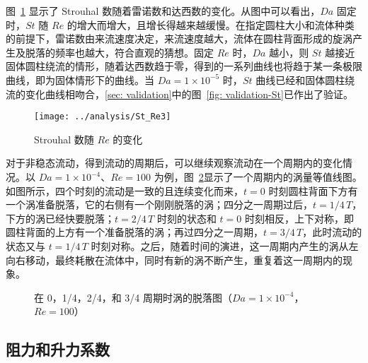 图~\ref{fig: St} 显示了 Strouhal 数随着雷诺数和达西数的变化。从图中可以看出，$Da$ 固定时，$St$ 随 $Re$ 的增大而增大，且增长得越来越缓慢。在指定圆柱大小和流体种类的前提下，雷诺数由来流速度决定，来流速度越大，流体在圆柱背面形成的旋涡产生及脱落的频率也越大，符合直观的猜想。固定 $Re$ 时，$Da$ 越小，则 $St$ 越接近固体圆柱绕流的情形，随着达西数趋于零，得到的一系列曲线也将趋于某一条极限曲线，即为固体情形下的曲线。当 $Da=1 \times 10^{-5}$ 时，$St$ 曲线已经和固体圆柱绕流的变化曲线相吻合，\ref{sec: validation}中的图~\ref{fig: validation-St}已作出了验证。

\begin{figure}
	\centering
	\texttt{[image: ../analysis/St\_Re3]}
	\caption{Strouhal 数随 $Re$ 的变化}
	\label{fig: St}
\end{figure}

对于非稳态流动，得到流动的周期后，可以继续观察流动在一个周期内的变化情况。以 $Da=1\times 10^{-4}$、$Re=100$ 为例，图~\ref{fig: 4*vortex}显示了一个周期内的涡量等值线图。如图所示，四个时刻的流动是一致的且连续变化而来，$t=0$ 时刻圆柱背面下方有一个涡准备脱落，它的右侧有一个刚刚脱落的涡；四分之一周期过后，$t=1/4\,T$，下方的涡已经快要脱落；$t=2/4\,T$ 时刻的状态和 $t=0$ 时刻相反，上下对称，即圆柱背面的上方有一个准备脱落的涡；再过四分之一周期，$t=3/4\,T$，此时流动的状态又与 $t=1/4\,T$ 时刻对称。之后，随着时间的演进，这一周期内产生的涡从左向右移动，最终耗散在流体中，同时有新的涡不断产生，重复着这一周期内的现象。

\begin{figure}
	\centering
	\begin{minipage}{\textwidth}
		\centering
	\end{minipage}
	\centering
	\begin{minipage}{\textwidth}
		\centering
	\end{minipage}
	\caption{在 0，1/4，2/4，和 3/4 周期时涡的脱落图（$Da=1\times 10^{-4}$，$Re=100$）}
	\label{fig: 4*vortex}
\end{figure}

\subsection{阻力和升力系数}

